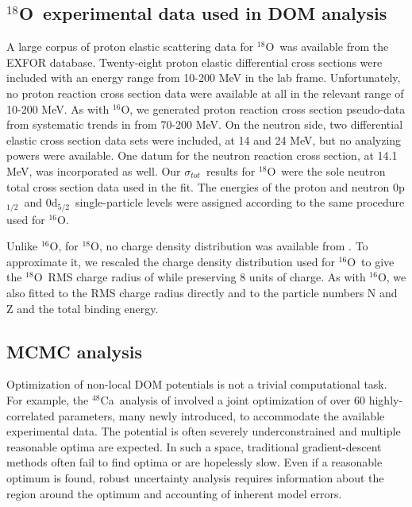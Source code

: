 \documentclass[twocolumn,secnumarabic,amssymb, nobibnotes, aps, prl,
superscriptaddress, nobalancelastpage, draft]{revtex4}
\newcommand{\tot}{\ensuremath{\sigma_{tot}}}
\newcommand{\oSix}{\ensuremath{^{16}}O}
\newcommand{\oEight}{\ensuremath{^{18}}O}
\newcommand{\caEight}{\ensuremath{^{48}}C\lowercase{a}}
\newcommand{\pOne}{p\ensuremath{_{1/2}}}
\newcommand{\dFive}{d\ensuremath{_{5/2}}}
\begin{document}
\subsection{\oEight\ experimental data used in DOM analysis}
A large corpus of proton elastic scattering data for \oEight\ was
available from the EXFOR database. Twenty-eight proton elastic differential cross
sections were included with an energy range from 10-200 MeV in the lab frame.
Unfortunately, no proton reaction cross section data were available at all in
the relevant range of 10-200 MeV. As with \oSix, we generated proton reaction cross section pseudo-data from
systematic trends in \cite{Carlson1975} from 70-200 MeV. On the neutron side, two
differential elastic cross section data sets were included, at 14 and 24 MeV,
but no analyzing powers were available. One datum for the neutron reaction cross
section, at 14.1 MeV, was incorporated as well.
Our \tot\ results for \oEight\ were the
sole neutron total cross section data used in the fit. The energies of the
proton and neutron 0\pOne\ and 0\dFive\ single-particle
levels were assigned according to the same procedure used for \oSix.

Unlike \oSix, for \oEight, no charge density distribution was available from
\cite{DeVries1987}. To approximate it, we rescaled the charge density
distribution used for \oSix\ to give the \oEight\ RMS charge radius of
\cite{Angeli2013} while preserving 8 units of charge.
As with \oSix, we also fitted to the
RMS charge radius directly and to the particle numbers N and Z and the
total binding energy.

\subsection{MCMC analysis}
Optimization of non-local DOM potentials is not a trivial computational task.
For example, the \caEight\ analysis of \cite{Mahzoon2017} involved a joint
optimization of over 60 highly-correlated parameters, many newly introduced, to
accommodate the available experimental data. The potential is
often severely underconstrained and multiple reasonable optima are expected.
In such a space, traditional gradient-descent methods often fail to find optima
or are hopelessly slow. Even if a reasonable optimum is found, robust
uncertainty analysis requires information about the region around the optimum and
accounting of inherent model errors.
\end{document}
